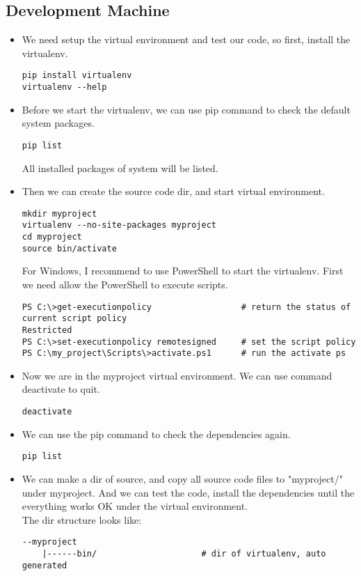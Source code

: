 \documentclass{article}
\begin{document}
\subsection{Development Machine}
\begin{itemize}
\item
We need setup the virtual environment and test our code, so first, install the virtualenv.
\begin{lstlisting}
pip install virtualenv
virtualenv --help
\end{lstlisting}
\item
Before we start the virtualenv, we can use pip command to check the default system packages.
\begin{lstlisting}
pip list
\end{lstlisting}
All installed packages of system will be listed.
\item
Then we can create the source code dir, and start virtual environment.
\begin{lstlisting}
mkdir myproject
virtualenv --no-site-packages myproject 
cd myproject
source bin/activate
\end{lstlisting}
For Windows, I recommend to use PowerShell to start the virtualenv. First we need allow the PowerShell to execute scripts.
\begin{lstlisting}
PS C:\>get-executionpolicy                  # return the status of current script policy
Restricted
PS C:\>set-executionpolicy remotesigned     # set the script policy
PS C:\my_project\Scripts\>activate.ps1      # run the activate ps
\end{lstlisting}
\item
Now we are in the myproject virtual environment. We can use command deactivate to quit.
\begin{lstlisting}
deactivate
\end{lstlisting}
\item
We can use the pip command to check the dependencies again.
\begin{lstlisting}
pip list
\end{lstlisting}
\item
We can make a dir of source, and copy all source code files to "myproject/" under myproject.
And we can test the code, install the dependencies until the everything works OK under the virtual environment. \\
The dir structure looks like:
\begin{lstlisting}
--myproject
    |------bin/                     # dir of virtualenv, auto generated

\end{lstlisting}
\end{itemize}
\end{document}
